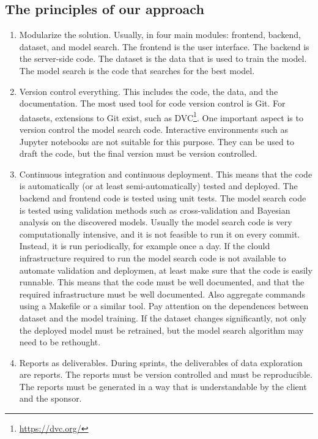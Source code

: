 \subsection{The principles of our approach}

\begin{enumerate}
  \item Modularize the solution. Usually, in four main modules: frontend, backend,
    dataset, and model search.  The frontend is the user interface.  The backend is the
    server-side code.  The dataset is the data that is used to train the model.  The model
    search is the code that searches for the best model.
  \item Version control everything.  This includes the code, the data, and the
    documentation. The most used tool for code version control is Git.  For datasets,
    extensions to Git exist, such as DVC\footnote{\url{https://dvc.org/}}.  One important aspect
    is to version control the model search code.  Interactive environments such as Jupyter
    notebooks are not suitable for this purpose.  They can be used to draft the code, but
    the final version must be version controlled.
  \item Continuous integration and continuous deployment.  This means that the code is
    automatically (or at least semi-automatically) tested and deployed.  The backend and
    frontend code is tested using unit tests.  The model search code is tested using
    validation methods such as cross-validation and Bayesian analysis on the discovered
    models.  Usually the model search code is very computationally intensive, and it is
    not feasible to run it on every commit.  Instead, it is run periodically, for example
    once a day.  If the clould infrastructure required to run the model search code is not
    available to automate validation and deploymen, at least make sure that the code is
    easily runnable.  This means that the code must be well documented, and that the
    required infrastructure must be well documented.  Also aggregate commands using a
    Makefile or a similar tool.  Pay attention on the dependences between dataset and the
    model training.  If the dataset changes significantly, not only the deployed model
    must be retrained, but the model search algorithm may need to be rethought.
  \item Reports as deliverables.  During sprints, the deliverables of data exploration are
    reports.  The reports must be version controlled and must be reproducible.  The reports
    must be generated in a way that is understandable by the client and the sponsor.

\end{enumerate}
